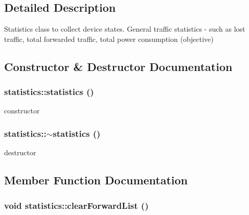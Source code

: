 \subsection{Detailed Description}
Statistics class to collect device states. General traffic statistics -\/ such as lost traffic, total forwarded traffic, total power consumption (objective) 

\subsection{Constructor \& Destructor Documentation}
\hypertarget{classstatistics_a31d6750c3251c979f5c2d013984e1162}{
\subsubsection[{statistics}]{\setlength{\rightskip}{0pt plus 5cm}statistics::statistics ()}}
\label{classstatistics_a31d6750c3251c979f5c2d013984e1162}


constructor 

\hypertarget{classstatistics_a8cf720227802726be118712dc6616f94}{
\subsubsection[{$\sim$statistics}]{\setlength{\rightskip}{0pt plus 5cm}statistics::$\sim$statistics ()}}
\label{classstatistics_a8cf720227802726be118712dc6616f94}


destructor 



\subsection{Member Function Documentation}
\hypertarget{classstatistics_aa371004886cf08d7632027c575d983fc}{
\subsubsection[{clearForwardList}]{\setlength{\rightskip}{0pt plus 5cm}void statistics::clearForwardList ()}}
\label{classstatistics_aa371004886cf08d7632027c575d983fc}


